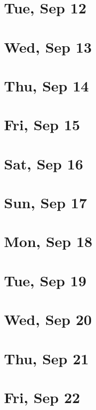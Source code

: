 	\section{Tue, Sep 12}
		
	\section{Wed, Sep 13}
		
	\section{Thu, Sep 14}
		
	\section{Fri, Sep 15}
		
	\section{Sat, Sep 16}
		
	\section{Sun, Sep 17}
		
	\section{Mon, Sep 18}
		
	\section{Tue, Sep 19}
		
	\section{Wed, Sep 20}
		
	\section{Thu, Sep 21}
		
	\section{Fri, Sep 22}
		
